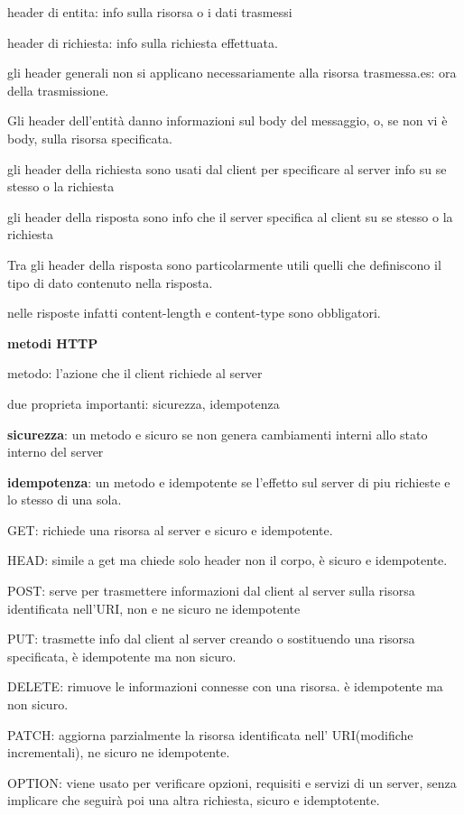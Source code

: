 \documentclass[12pt]{article}
\begin{document}
header di entita: info sulla risorsa o i dati trasmessi

header di richiesta: info sulla richiesta effettuata.

gli header generali non si applicano necessariamente alla risorsa trasmessa.es: ora della trasmissione.

Gli header dell’entità danno informazioni sul body del
messaggio, o, se non vi è body, sulla risorsa specificata.

gli header della richiesta sono usati dal client per specificare al server info su se stesso o la richiesta

gli header della risposta sono info che il server specifica al client su se stesso o la richiesta

Tra gli header della risposta sono particolarmente utili
quelli che definiscono il tipo di dato contenuto nella
risposta.

nelle risposte infatti content-length e content-type sono obbligatori.

\textbf{metodi HTTP}

metodo: l'azione che il client richiede al server

due proprieta importanti: sicurezza, idempotenza

\textbf{sicurezza}: un metodo e sicuro se non genera cambiamenti interni allo stato interno del server

\textbf{idempotenza}: un metodo e idempotente se l'effetto sul server di piu richieste e lo stesso di una sola.

GET: richiede una risorsa al server e sicuro e idempotente.

HEAD: simile a get ma chiede solo header non il corpo, è sicuro e idempotente.

POST: serve per trasmettere informazioni dal client al server sulla risorsa identificata nell'URI, non e ne sicuro ne idempotente

PUT: trasmette info dal client al server creando o sostituendo una risorsa specificata, è idempotente ma non sicuro.

DELETE: rimuove le informazioni connesse con una risorsa. è idempotente ma non sicuro.

PATCH: aggiorna parzialmente la risorsa identificata nell' URI(modifiche incrementali), ne sicuro ne idempotente.

OPTION: viene usato per verificare opzioni, requisiti e
servizi di un server, senza implicare che seguirà poi una
altra richiesta, sicuro e idemptotente.
\end{document}
